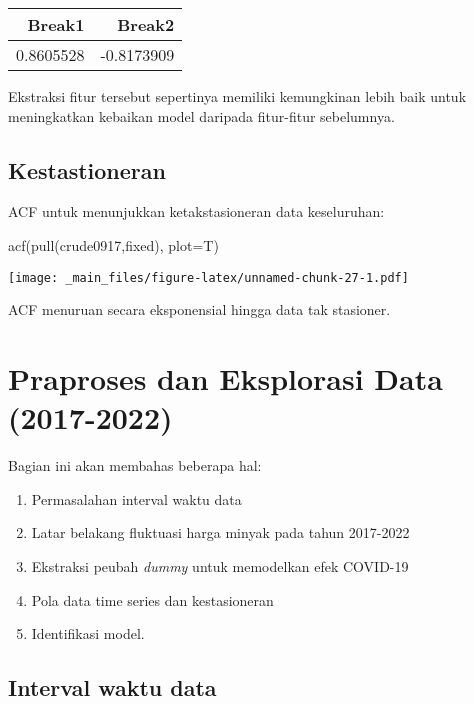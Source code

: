 \documentclass[
]{book}
\newenvironment{Shaded}{\begin{snugshade}}{\end{snugshade}}
\newcommand{\AttributeTok}[1]{\textcolor[rgb]{0.77,0.63,0.00}{#1}}
\newcommand{\FunctionTok}[1]{\textcolor[rgb]{0.00,0.00,0.00}{#1}}
\newcommand{\NormalTok}[1]{#1}
\providecommand{\tightlist}{%
  \setlength{\itemsep}{0pt}\setlength{\parskip}{0pt}}
\begin{document}
\begin{tabular}{r|r}
\hline
Break1 & Break2\\
\hline
0.8605528 & -0.8173909\\
\hline
\end{tabular}

Ekstraksi fitur tersebut sepertinya memiliki kemungkinan lebih baik untuk meningkatkan kebaikan model daripada fitur-fitur sebelumnya.

\hypertarget{kestastioneran}{%
\section{Kestastioneran}\label{kestastioneran}}

ACF untuk menunjukkan ketakstasioneran data keseluruhan:

\begin{Shaded}
\begin{Highlighting}[]
\FunctionTok{acf}\NormalTok{(}\FunctionTok{pull}\NormalTok{(crude0917,fixed), }\AttributeTok{plot=}\NormalTok{T)}
\end{Highlighting}
\end{Shaded}

\texttt{[image: \_main\_files/figure-latex/unnamed-chunk-27-1.pdf]}

ACF menuruan secara eksponensial hingga data tak stasioner.

\hypertarget{praproses-dan-eksplorasi-data-2017-2022}{%
\chapter{Praproses dan Eksplorasi Data (2017-2022)}\label{praproses-dan-eksplorasi-data-2017-2022}}

Bagian ini akan membahas beberapa hal:

\begin{enumerate}
\def\labelenumi{\arabic{enumi}.}
\tightlist
\item
  Permasalahan interval waktu data
\item
  Latar belakang fluktuasi harga minyak pada tahun 2017-2022
\item
  Ekstraksi peubah \emph{dummy} untuk memodelkan efek COVID-19
\item
  Pola data time series dan kestasioneran
\item
  Identifikasi model.
\end{enumerate}

\hypertarget{interval-waktu-data-1}{%
\section{Interval waktu data}\label{interval-waktu-data-1}}
\end{document}
